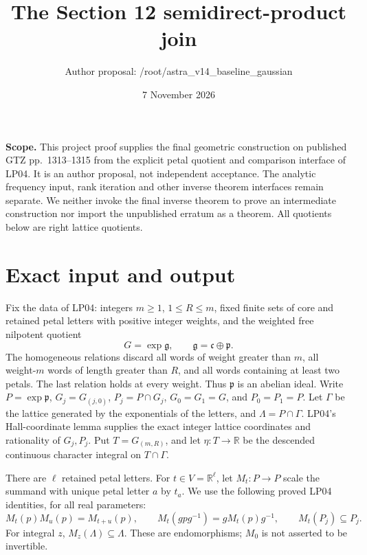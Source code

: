 \documentclass[11pt]{article}
\title{The Section 12 semidirect-product join}
\author{Author proposal: /root/astra\_v14\_baseline\_gaussian}
\date{7 November 2026}
\newcommand{\R}{\mathbb R}\newcommand{\Z}{\mathbb Z}
\begin{document}
\maketitle

\noindent\textbf{Scope.} This project proof supplies the final geometric
construction on published GTZ pp.~1313--1315 from the explicit petal quotient
and comparison interface of LP04. It is an author proposal, not independent
acceptance. The analytic frequency input, rank iteration and other inverse
theorem interfaces remain separate. We neither invoke the final inverse
theorem to prove an intermediate construction nor import the unpublished
erratum as a theorem. All quotients below are right lattice quotients.

\section{Exact input and output}
Fix the data of LP04: integers $m\geq1$, $1\leq R\leq m$, fixed finite
sets of core and retained petal letters with positive integer weights,
and the weighted free nilpotent quotient
\[
 G=\exp\mathfrak g,\qquad
 \mathfrak g=\mathfrak c\oplus\mathfrak p.
\]
The homogeneous relations discard all words of weight greater than $m$,
all weight-$m$ words of length greater than $R$, and all words containing
at least two petals. The last relation holds at every weight.
Thus $\mathfrak p$ is an abelian ideal. Write $P=\exp\mathfrak p$,
$G_j=G_{(j,0)}$, $P_j=P\cap G_j$, $G_0=G_1=G$, and $P_0=P_1=P$.
Let $\Gamma$ be the lattice generated by the exponentials of the letters,
and $\Lambda=P\cap\Gamma$. LP04's Hall-coordinate lemma supplies the
exact integer lattice coordinates and rationality of $G_j,P_j$.
Put $T=G_{(m,R)}$, and let $\eta:T\to\R$ be the descended continuous
character integral on $T\cap\Gamma$.

There are $\ell$ retained petal letters. For $t\in V=\R^\ell$, let
$M_t:P\to P$ scale the summand with unique petal letter $a$ by $t_a$.
We use the following proved LP04 identities, for all real parameters:
\begin{equation}\label{eq:actions}
 M_t(p)M_u(p)=M_{t+u}(p),\qquad
 M_t(gpg^{-1})=gM_t(p)g^{-1},\qquad M_t(P_j)\subseteq P_j.
\end{equation}
For integral $z$, $M_z(\Lambda)\subseteq\Lambda$. These are
endomorphisms; $M_0$ is not asserted to be invertible.
\end{document}
